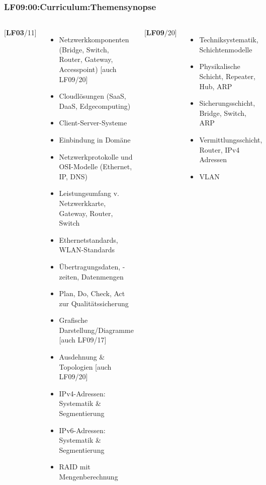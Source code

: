 

\begin{frame}
  \frametitle{LF09:00:Curriculum:Themensynopse}
  \begin{tiny}
  \begin{columns}[T]
    [\textbf{LF03}/11]
    \begin{itemize}
      \item[\faSquareO] Netzwerkkomponenten (Bridge, Switch, Router, Gateway, Accesspoint) [auch LF09/20]
      \item[\faSquareO] Cloudlösungen (SaaS, DaaS, Edgecomputing) 
      \item[\faSquareO] Client-Server-Systeme 
      \item[\faSquareO] Einbindung in Domäne
      \item[\faSquareO] Netzwerkprotokolle und OSI-Modelle (Ethernet, IP, DNS) 
      \item[\faSquareO] Leistungsumfang v. Netzwerkkarte, Gateway, Router, Switch 
      \item[\faSquareO] Ethernetstandards, WLAN-Standards 
      \item[\faSquareO] Übertragungsdaten, -zeiten, Datenmengen 
      \item[\faSquareO] Plan, Do, Check, Act zur Qualitätssicherung 
      \item[\faSquareO] Grafische Darstellung/Diagramme [auch LF09/17]
      \item[\faSquareO] Ausdehnung \& Topologien [auch LF09/20]
      \item[\faSquareO] IPv4-Adressen: Systematik \& Segmentierung
      \item[\faSquareO] IPv6-Adressen: Systematik \& Segmentierung
      \item[\faSquareO] RAID mit Mengenberechnung
    \end{itemize}
    [\textbf{LF09}/20]
    \begin{itemize}
      \item[\faSquareO] Techniksystematik, Schichtenmodelle 
      \item[\faSquareO] Physikalische Schicht, Repeater, Hub, ARP  
      \item[\faSquareO] Sicherungsschicht, Bridge, Switch, ARP 
      \item[\faSquareO] Vermittlungsschicht, Router, IPv4 Adressen 
      \item[\faSquareO] VLAN 
    \end{itemize}


\end{columns}
\end{tiny}
\end{frame}
